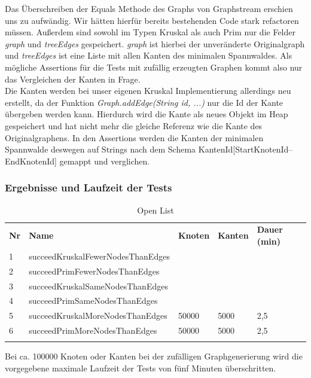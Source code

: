 \documentclass[a4paper]{article}
\begin{document}
Das Überschreiben der Equals Methode des Graphs von Graphstream erschien uns zu aufwändig. Wir hätten hierfür bereits bestehenden Code stark refactoren müssen. Außerdem sind sowohl im Typen Kruskal als auch Prim nur die Felder \textit{graph} und \textit{treeEdges} gespeichert. \textit{graph} ist hierbei der unveränderte Originalgraph und \textit{treeEdges} ist eine Liste mit allen Kanten des minimalen Spannwaldes. Als mögliche Assertions für die Tests mit zufällig erzeugten Graphen kommt also nur das Vergleichen der Kanten in Frage.\\
Die Kanten werden bei unser eigenen Kruskal Implementierung allerdings neu erstellt, da der Funktion \textit{Graph.addEdge(String id, ...)} nur die Id der Kante übergeben werden kann. Hierdurch wird die Kante als neues Objekt im Heap gespeichert und hat nicht mehr die gleiche Referenz wie die Kante des Originalgraphens. In den Assertions werden die Kanten der minimalen Spannwalde deswegen auf Strings nach dem Schema KantenId[StartKnotenId--EndKnotenId] gemappt und verglichen.

\subsubsection{Ergebnisse und Laufzeit der Tests}

\begin{table}[htbp]
    \centering
    \begin{tabular}{||l|l|l|l|l||}
    \hhline{|t:=====:t|}
    \textbf{Nr} & \textbf{Name} & \textbf{Knoten} & \textbf{Kanten} & \textbf{Dauer (min)} \\ \hhline{|-----|}
         1 & succeedKruskalFewerNodesThanEdges & & & \\ \hhline{|-----|}
         2 & succeedPrimFewerNodesThanEdges & & & \\ \hhline{|-----|}
         3 & succeedKruskalSameNodesThanEdges & & & \\ \hhline{|-----|}
         4 & succeedPrimSameNodesThanEdges & & & \\ \hhline{|-----|}
         5 & succeedKruskalMoreNodesThanEdges & 50000 & 5000 & 2,5 \\ \hhline{|-----|}
         6 & succeedPrimMoreNodesThanEdges & 50000 & 5000 & 2,5 \\ \hhline{|b:=====:b|}
    \end{tabular}
    \caption{Open List}
\end{table}

Bei ca. 100000 Knoten oder Kanten bei der zufälligen Graphgenerierung wird die vorgegebene maximale Laufzeit der Tests von fünf Minuten überschritten. 




\end{document}
